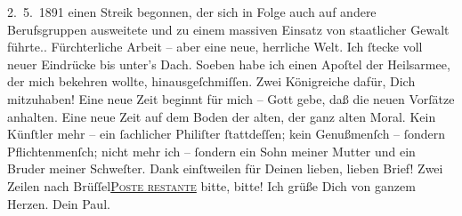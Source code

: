 \begin{ledgroupsized}[t]{13cm}
{{{                     2. 5. 1891 einen Streik begonnen, der sich in Folge auch auf
                  andere Berufsgruppen ausweitete und zu einem massiven Einsatz von staatlicher
                  Gewalt führte.}}}\label{K_L02662-1h}. Fürchterliche Arbeit – aber eine neue, herrliche Welt. Ich
               ſtecke voll neuer Eindrücke bis unter’s Dach. Soeben habe ich einen Apoſtel der Heilsarmee, der mich bekehren wollte,
               hinausgeſchmiſſen. Zwei Königreiche dafür, Dich mitzuhaben! Eine neue Zeit beginnt
               für mich – Gott gebe, daß die neuen Vorſätze anhalten. Eine neue Zeit auf dem Boden
               der alten, der ganz alten Moral. Kein Künſtler mehr – ein ſachlicher Philiſter
               ſtattdeſſen; kein Genußmenſch – ſondern \strikeout{\textcolor{gray}{nur}} Pflichtenmenſch; nicht mehr ich – ſondern ein Sohn meiner Mutter und ein Bruder meiner Schweſter. \label{K_L02662-2v}\label{K_L02662-2h} Dank einſtweilen für Deinen lieben, lieben Brief! Zwei
               Zeilen nach Brüſſel\introOben{}\textsc{\uline{Poste restante}}\introOben{}{ }{\dotstwo} bitte, bitte! Ich grüße Dich von ganzem Herzen. Dein
                  \spacefill\mbox{Paul.}\pend
           \pstart
           \noindent{}\label{T_L02662-1v}\label{T_L02662-1h}\pend
           
         
         \endnumbering{}\end{ledgroupsized}  \newcommand{\dateiname}{L02662}\newcommand{\titel}{Paul Goldmann an Arthur Schnitzler, 11. 5. 1891}\newcommand{\editorInnen}{Martin Anton Müller und Laura Untner}
      